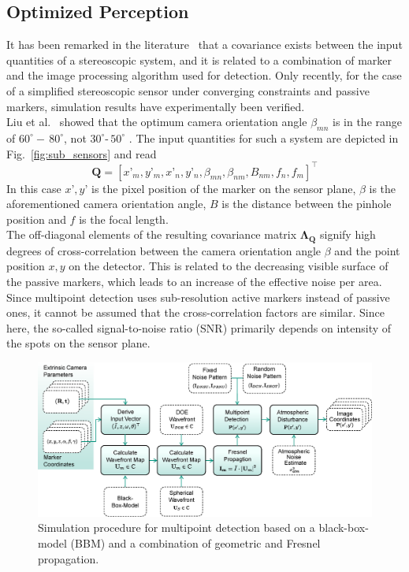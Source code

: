 \documentclass[5p,times,procedia]{elsarticle}
\begin{document}
\subsection{Optimized Perception}\label{subsec:OptPerception}
It has been remarked in the literature~\cite{Di_Leo_2011} that a covariance exists between the input quantities of a stereoscopic system, and it is related to a combination of marker and the image processing algorithm used for detection.
Only recently, for the case of a simplified stereoscopic sensor under converging constraints and passive markers, simulation results have experimentally been verified.\\
Liu et al.~\cite{Liu_2021} showed that the optimum camera orientation angle $\beta_{mn}$ is in the range of $60^{\circ} -\, 80^{\circ}$, not $30^{\circ} \text{-}\, 50^{\circ}$ \cite{Yang2018,Fooladgar2013,Sankowski2017}. The input quantities for such a system are depicted in Fig.~\ref{fig:sub_sensors} and read
%
\begin{equation*}
	\mathbf{Q}= \left[x’_m, y’_m, x’_n, y’_n, \beta_{mn}, \beta_{nm}, B_{nm}, f_{n},f_{m}\right]^{\top}
\end{equation*}
%
In this case $x’, y’$ is the pixel position of the marker on the sensor plane, $\beta$ is the aforementioned camera orientation angle, $B$ is the distance between the pinhole position and $f$ is the focal length.\\
The off-diagonal elements of the resulting covariance matrix $\mathbf{\Lambda_{Q}}$ signify high degrees of cross-correlation between the camera orientation angle $\beta$ and the point position $x,y$ on the detector. This is related to the decreasing visible surface of the passive markers, which leads to an increase of the effective noise per area.\\
Since multipoint detection \cite{Haist2015} uses sub-resolution active markers instead of passive ones, it cannot be assumed that the cross-correlation factors are similar. Since here, the so-called signal-to-noise ratio (SNR) primarily depends on intensity of the spots on the sensor plane.
%
\begin{figure}[!htb]
	\centering
	\includegraphics[width=1.0\columnwidth]{graphics/OpticalSimulation.eps}
	\caption{Simulation procedure for multipoint detection based on a black-box-model (BBM) and a combination of geometric and Fresnel propagation.}
	\label{fig:opto-sim}
\end{figure}
\end{document}
